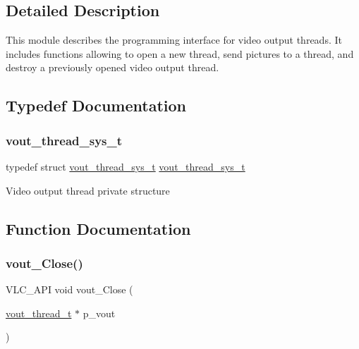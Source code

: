 \subsection{Detailed Description}
This module describes the programming interface for video output threads. It includes functions allowing to open a new thread, send pictures to a thread, and destroy a previously opened video output thread. 

\subsection{Typedef Documentation}
\mbox{\label{group__video__output_ga88d1c41dc17e170ca31480d77bb7a924}} 
\subsubsection{\texorpdfstring{vout\+\_\+thread\+\_\+sys\+\_\+t}{vout\_thread\_sys\_t}}
{\footnotesize\ttfamily typedef struct \hyperlink{group__video__output_ga88d1c41dc17e170ca31480d77bb7a924}{vout\+\_\+thread\+\_\+sys\+\_\+t} \hyperlink{group__video__output_ga88d1c41dc17e170ca31480d77bb7a924}{vout\+\_\+thread\+\_\+sys\+\_\+t}}

Video output thread private structure 

\subsection{Function Documentation}
\mbox{\label{group__video__output_gac4265e793646e4730afe6ce9495205ae}} 
\subsubsection{\texorpdfstring{vout\+\_\+\+Close()}{vout\_Close()}}
{\footnotesize\ttfamily V\+L\+C\+\_\+\+A\+PI void vout\+\_\+\+Close (\begin{DoxyParamCaption}\item[{\hyperlink{structvout__thread__t}{vout\+\_\+thread\+\_\+t} $\ast$}]{p\+\_\+vout }\end{DoxyParamCaption})}

